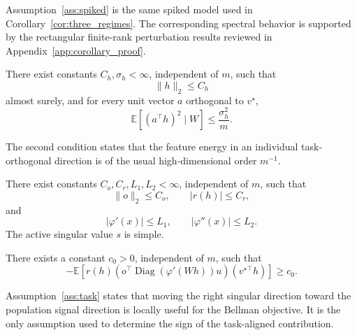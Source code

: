 Assumption~\ref{ass:spiked} is the same spiked model used in
Corollary~\ref{cor:three_regimes}. The corresponding spectral behavior is
supported by the rectangular finite-rank perturbation results reviewed in
Appendix~\ref{app:corollary_proof}.

\begin{assumption}
\label{ass:features}
There exist constants $C_h,\sigma_h<\infty$, independent of $m$, such that
\begin{equation}
\|h\|_2\leq C_h
\end{equation}
almost surely, and for every unit vector $a$ orthogonal to $v^\star$,
\begin{equation}
\mathbb{E}
\left[
(a^\top h)^2\mid W
\right]
\leq
\frac{\sigma_h^2}{m}.
\label{eq:orthogonal_energy}
\end{equation}
\end{assumption}

The second condition states that the feature energy in an individual
task-orthogonal direction is of the usual high-dimensional order $m^{-1}$.

\begin{assumption}
\label{ass:regularity}
There exist constants $C_o,C_r,L_1,L_2<\infty$, independent of $m$, such that
\begin{equation}
\|o\|_2\leq C_o,
\qquad
|r(h)|\leq C_r,
\end{equation}
and
\begin{equation}
|\varphi'(x)|\leq L_1,
\qquad
|\varphi''(x)|\leq L_2.
\end{equation}
The active singular value $s$ is simple.
\end{assumption}

\begin{assumption}
\label{ass:task}
There exists a constant $c_0>0$, independent of $m$, such that
\begin{equation}
-
\mathbb{E}
\left[
r(h)
\left(
o^\top
\operatorname{Diag}(\varphi'(Wh))u
\right)
(v^{\star\top}h)
\right]
\geq
c_0.
\label{eq:task_relevance}
\end{equation}
\end{assumption}

Assumption~\ref{ass:task} states that moving the right singular direction
toward the population signal direction is locally useful for the Bellman
objective. It is the only assumption used to determine the sign of the
task-aligned contribution.


